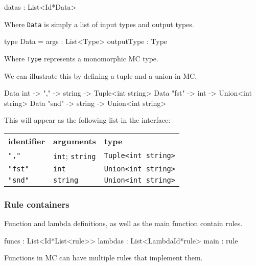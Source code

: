 \begin{FS}
datas : List<Id*Data>
\end{FS}

Where \verb|Data| is simply a list of input types and output types.

\begin{FS}
type Data = {
  args       : List<Type>
  outputType : Type
}
\end{FS}

Where \verb|Type| represents a monomorphic MC type.


We can illustrate this by defining a tuple and a union in MC.

\begin{MC}
Data int -> "," -> string -> Tuple<int string>
Data "fst" -> int    -> Union<int string>
Data "snd" -> string -> Union<int string>
\end{MC}

This will appear as the following list in the interface:

{\footnotesize
\begin{tabular}{lll}
    \textbf{\normalsize identifier} & \textbf{\normalsize arguments} & \textbf{\normalsize type}\\
    \verb:",":   & \verb:int:; \verb:string: & \verb:Tuple<int string>: \\
    \verb:"fst": & \verb:int:                & \verb:Union<int string>: \\
    \verb:"snd": & \verb:string:             & \verb:Union<int string>: \\
\end{tabular}
}


\subsubsection{Rule containers}

Function and lambda definitions, as well as the main function contain rules.

\begin{FS}
  funcs   : List<Id*List<rule>>
  lambdas : List<LambdaId*rule>
  main    : rule
\end{FS}

Functions in MC can have multiple rules that implement them.

